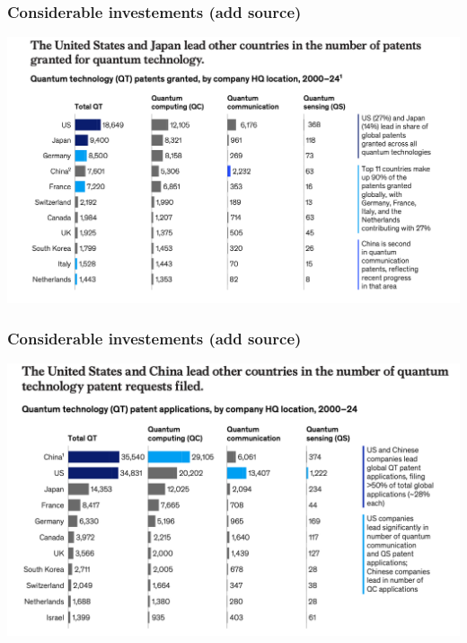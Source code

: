 \documentclass{beamer}
\begin{document}
\begin{frame}
\frametitle{Considerable investements (add source)}


\centerline{\includegraphics[width=1.0\linewidth]{qcfigures/image4.png}}

\end{frame}

\begin{frame}
\frametitle{Considerable investements (add source)}


\centerline{\includegraphics[width=1.0\linewidth]{qcfigures/image5.png}}

\end{frame}
\end{document}
